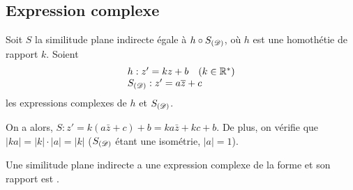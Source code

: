       \subsection{Expression complexe}
            Soit $S$ la similitude plane indirecte \'egale \`a $h \circ S_{(\mathscr{D})}$, o\`u $h$ est une homoth\'etie de rapport $k$.
            Soient 
            \[
                  \begin{array}{l}
                        h : z' = k z + b \quad (k \in \mathbb{R}^*) \\
                        S_{(\mathscr{D})} : z' = a \overline{z} + c 
                  \end{array}
            \]
            les expressions complexes de $h$ et $S_{(\mathscr{D})}$.
            
            On a alors, $S : z' = k \left( a \bar{z} + c \right) + b = k a \bar{z} + k c + b$.
            De plus, on v\'erifie que $|k a| = |k| \cdot |a| = |k|$ ($S_{(\mathscr{D})}$ \'etant une isom\'etrie, $|a| = 1$).
            
            Une similitude plane indirecte a une expression complexe de la forme 
            et son rapport est .
            
